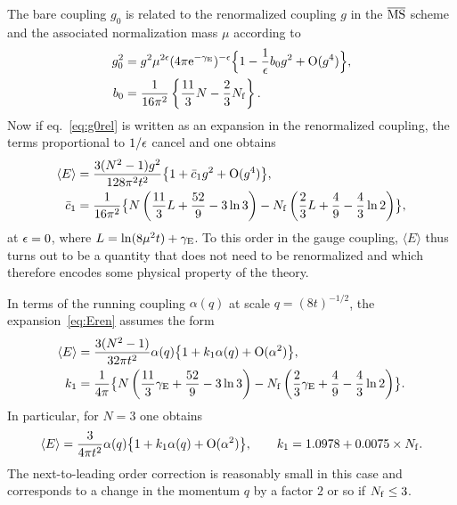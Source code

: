 The bare coupling $g_0$ is related to
the renormalized coupling $g$
in the $\overline{\mathrm{MS}}$ scheme
and the associated normalization mass $\mu$
according to~\cite{BardeenEtAl}
\begin{align}
  g_0^2&=g^2\mu^{2\epsilon}(4\pi\mathrm{e}^{-\gamma_{\mathrm{E}}})^{-\epsilon}
  \Bigl\{1-\frac{1}{\epsilon}b_0g^2+\mathrm{O}(g^4)\Bigr\},
  \label{eq:g0rel}\\
  b_0&={1\over16\pi^2}\left\{\frac{11}{3}N-\frac{2}{3}N_{\mathrm{f}}\right\}.
\end{align}
Now if eq.~\eqref{eq:g0rel} is written as an expansion in the renormalized coupling,
the terms proportional to $1/\epsilon$ cancel and one obtains
\begin{align}
  \langle E\rangle&={3(N^2-1)g^2\over128\pi^2t^2}
  \bigl\{1+\bar{c}_1g^2+\mathrm{O}(g^4)
  \bigr\},
  \label{eq:Eren}\\
  \bar{c}_1&=
  {1\over16\pi^2}\bigl\{
  N\left(\frac{11}{3}L+\frac{52}{9}-3\ln3\right)
  -N_{\mathrm{f}}\left(\frac{2}{3}L+\frac{4}{9}-\frac{4}{3}\ln2\right)\bigr\},
\end{align}
at $\epsilon=0$, where $L=\ln(8\mu^2t)+\gamma_{\mathrm{E}}$.
To this order in the gauge coupling,
$\langle E\rangle$ thus turns out to be a
quantity that does not need to be renormalized
and which therefore encodes some physical property of
the theory.

In terms of the running coupling $\alpha(q)$
at scale $q=(8t)^{-1/2}$,
the expansion~\eqref{eq:Eren} assumes the form
\begin{align}
  \langle E\rangle&={3(N^2-1)\over32\pi t^2}\alpha(q)
  \bigl\{1+k_1\alpha(q)+\mathrm{O}(\alpha^2)
  \bigr\},
  \label{eq:Erun}\\
  k_1&=
  {1\over4\pi}\bigl\{
  N\left(\frac{11}{3}\gamma_{\mathrm{E}}+\frac{52}{9}-3\ln3\right)
  -N_{\mathrm{f}}\left(\frac{2}{3}\gamma_{\mathrm{E}}+\frac{4}{9}-\frac{4}{3}\ln2\right)\bigr\}.
\end{align}
In particular, for $N=3$ one obtains
\begin{equation}
  \langle E\rangle={3\over4\pi t^2}\alpha(q)
  \bigl\{1+k_1\alpha(q)+\mathrm{O}(\alpha^2)
  \bigr\},
  \qquad
  k_1=1.0978+0.0075\times N_{\mathrm{f}}.
  \label{eq:E3}
\end{equation}
The next-to-leading order correction is reasonably small in
this case and corresponds
to a change in the momentum $q$ by a factor $2$ or so if $N_{\mathrm{f}}\leq3$.

